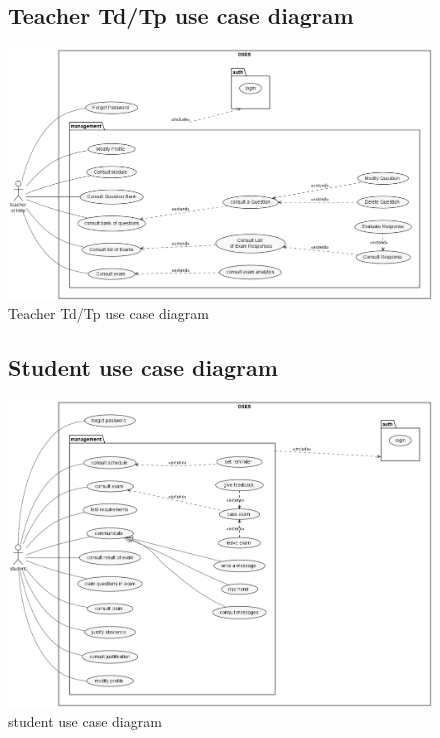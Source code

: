 \documentclass[]{uc2pfecaneva}
\begin{document}
    \begin{figure}
        \subsection{Teacher Td/Tp use case diagram}
        \centering
        \includegraphics[width=\textwidth]{images/TP_TD_Teacher}
        \caption{Teacher Td/Tp use case diagram}
    \end{figure}

    \begin{figure}
        \subsection{Student use case diagram}
        \centering
        \includegraphics[width=350pt]{images/student_UCD}
        \caption{student use case diagram}
    \end{figure}
\end{document}

